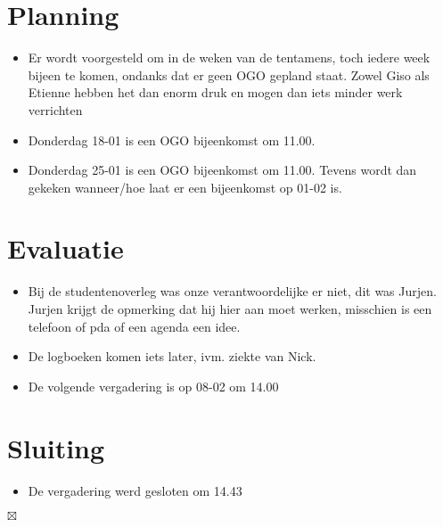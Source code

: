 \documentclass[]{article}
\begin{document}
\section{Planning}

\begin{itemize}
   \item Er wordt voorgesteld om in de weken van de tentamens, toch iedere week bijeen te komen, ondanks dat er geen OGO gepland staat. Zowel Giso als Etienne hebben het dan enorm druk en mogen dan iets minder werk verrichten
   \item Donderdag 18-01 is een OGO bijeenkomst om 11.00.
   \item Donderdag 25-01 is een OGO bijeenkomst om 11.00. Tevens wordt dan gekeken wanneer/hoe laat er een bijeenkomst op 01-02 is.
\end{itemize}

\section{Evaluatie}

\begin{itemize}
   \item Bij de studentenoverleg was onze verantwoordelijke er niet, dit was Jurjen. Jurjen krijgt de opmerking dat hij hier aan moet werken, misschien is een telefoon of pda of een agenda een idee.
   \item De logboeken komen iets later, ivm. ziekte van Nick.
   \item De volgende vergadering is op 08-02 om 14.00
\end{itemize}

\section{Sluiting}
  \begin{itemize}
    \item De vergadering werd gesloten om 14.43
  \end{itemize}

$\boxtimes$
\end{document}
